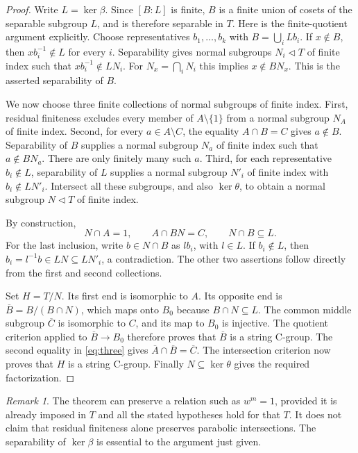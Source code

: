 \documentclass[11pt]{article}
\theoremstyle{remark}\newtheorem{remark}[theorem]{Remark}
\begin{document}
\begin{proof}
Write \(L=\ker\beta\). Since \([B:L]\) is finite, \(B\) is a finite union
of cosets of the separable subgroup \(L\), and is therefore separable in
\(T\). Here is the finite-quotient argument explicitly. Choose representatives
\(b_1,\ldots,b_k\) with \(B=\bigcup_i Lb_i\). If \(x\notin B\), then
\(xb_i^{-1}\notin L\) for every \(i\). Separability gives normal subgroups
\(N_i\lhd T\) of finite index such that
\(xb_i^{-1}\notin LN_i\). For \(N_x=\bigcap_iN_i\) this implies
\(x\notin BN_x\). This is the asserted separability of \(B\).

We now choose three finite collections of normal subgroups of finite index.
First, residual finiteness excludes every member of \(A\setminus\{1\}\)
from a normal subgroup \(N_A\) of finite index. Second, for every
\(a\in A\setminus C\), the equality \(A\cap B=C\) gives \(a\notin B\).
Separability of \(B\) supplies a normal subgroup \(N_a\) of finite index
such that \(a\notin BN_a\). There are only finitely many such \(a\).
Third, for each representative \(b_i\notin L\), separability of \(L\)
supplies a normal subgroup \(N'_i\) of finite index with
\(b_i\notin LN'_i\). Intersect all these subgroups, and also \(\ker\theta\),
to obtain a normal subgroup \(N\lhd T\) of finite index.

By construction,
\begin{equation}\label{eq:three}
 N\cap A=1,\qquad A\cap BN=C,\qquad N\cap B\subseteq L.
\end{equation}
For the last inclusion, write \(b\in N\cap B\) as \(lb_i\), with \(l\in L\).
If \(b_i\notin L\), then \(b_i=l^{-1}b\in LN\subseteq LN'_i\), a
contradiction. The other two assertions follow directly from the first and
second collections.

Set \(H=T/N\). Its first end is isomorphic to \(A\). Its opposite end is
\(\overline B=B/(B\cap N)\), which maps onto \(B_0\) because
\(B\cap N\subseteq L\). The common middle subgroup \(\overline C\) is
isomorphic to \(C\), and its map to \(B_0\) is injective. The quotient
criterion applied to \(\overline B\to B_0\) therefore proves that
\(\overline B\) is a string C-group. The second equality in
\eqref{eq:three} gives
\(\overline A\cap\overline B=\overline C\). The intersection criterion
now proves that \(H\) is a string C-group. Finally \(N\subseteq\ker\theta\)
gives the required factorization.
\end{proof}

\begin{remark}
The theorem can preserve a relation such as \(w^m=1\), provided it is
already imposed in \(T\) and all the stated hypotheses hold for that
\(T\). It does not claim that residual finiteness alone preserves
parabolic intersections. The separability of \(\ker\beta\) is essential
to the argument just given.
\end{remark}
\end{document}

